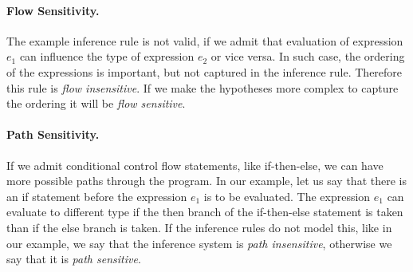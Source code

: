         \paragraph{Flow Sensitivity.}
        The example inference rule is not valid, if we admit that evaluation of 
        expression $e_1$ can influence the type of expression $e_2$ or vice versa. 
        In such case, the ordering of the expressions is important, but not captured 
        in the inference rule. Therefore this rule is \emph{flow insensitive}. If we make 
        the hypotheses more complex to capture the ordering 
        it will be \emph{flow sensitive}.
        
        \paragraph{Path Sensitivity.}
        If we admit conditional control flow statements, like if-then-else, 
        we can have more possible paths through the program. In our example, 
        let us say that there is an if statement before the expression $e_1$ 
        is to be evaluated. The expression $e_1$ can evaluate to different 
        type if the then branch of the if-then-else statement is taken than 
        if the else branch is taken. If the inference rules do not model 
        this, like in our example, we say that the inference system is 
        \emph{path insensitive}, otherwise we say that it is \emph{path sensitive}.
        
